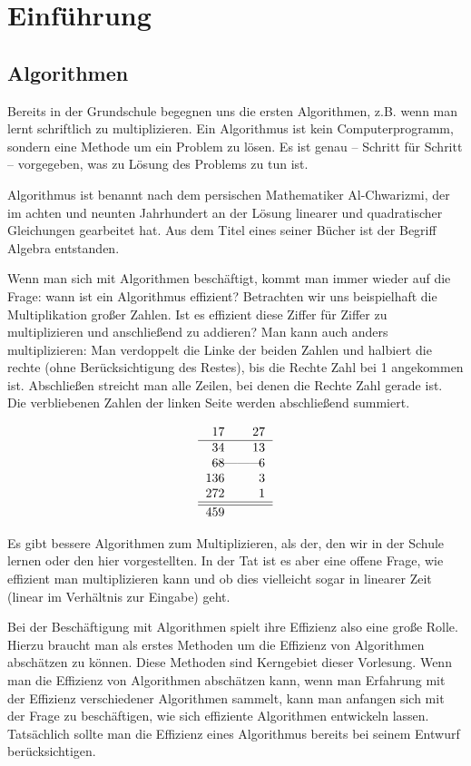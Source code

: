 \chapter*{Einführung}
\section*{Algorithmen}
Bereits in der Grundschule begegnen uns die ersten Algorithmen, z.B. wenn man lernt schriftlich zu multiplizieren. Ein Algorithmus ist kein Computerprogramm, sondern eine Methode um ein Problem zu lösen. Es ist genau -- Schritt für Schritt -- vorgegeben, was zu Lösung des Problems zu tun ist.

Algorithmus ist benannt nach dem persischen Mathematiker Al-Chwarizmi, der im achten und neunten Jahrhundert an der Lösung linearer und quadratischer Gleichungen gearbeitet hat. Aus dem Titel eines seiner Bücher ist der Begriff Algebra entstanden.

Wenn man sich mit Algorithmen beschäftigt, kommt man immer wieder auf die Frage: wann ist ein Algorithmus effizient? Betrachten wir uns beispielhaft die Multiplikation großer Zahlen. Ist es effizient diese Ziffer für Ziffer zu multiplizieren und anschließend zu addieren? Man kann auch anders multiplizieren: Man verdoppelt die Linke der beiden Zahlen und halbiert die rechte (ohne Berücksichtigung des Restes), bis die Rechte Zahl bei 1 angekommen ist. Abschließen streicht man alle Zeilen, bei denen die Rechte Zahl gerade ist. Die verbliebenen Zahlen der linken Seite werden abschließend summiert.

\[
\begin{tabular}{rr}
17\quad &\quad 27 \\\hline
34\quad &\quad 13 \\
\rlap{------------}68\quad &\quad 6 \\
136\quad &\quad 3 \\
272\quad &\quad 1\\\hline\hline
459
\end{tabular}
\]

Es gibt bessere Algorithmen zum Multiplizieren, als der, den wir in der Schule lernen oder den hier vorgestellten. In der Tat ist es aber eine offene Frage, wie effizient man multiplizieren kann und ob dies vielleicht sogar in linearer Zeit (linear im Verhältnis zur Eingabe) geht.

Bei der Beschäftigung mit Algorithmen spielt ihre Effizienz also eine große Rolle. Hierzu braucht man als erstes Methoden um die Effizienz von Algorithmen abschätzen zu können. Diese Methoden sind Kerngebiet dieser Vorlesung. Wenn man die Effizienz von Algorithmen abschätzen kann, wenn man Erfahrung mit der Effizienz verschiedener Algorithmen sammelt, kann man anfangen sich mit der Frage zu beschäftigen, wie sich effiziente Algorithmen entwickeln lassen. Tatsächlich sollte man die Effizienz eines Algorithmus bereits bei seinem Entwurf berücksichtigen.

